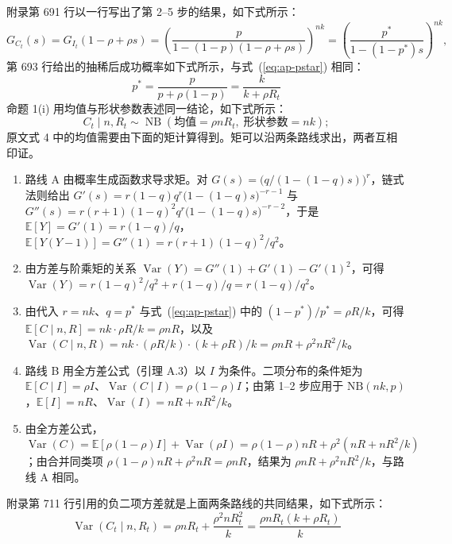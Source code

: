 附录第 691 行以一行写出了第 2--5 步的结果，如下式所示：
\begin{equation*}
G_{C_t}(s) = G_{I_t}(1 - \rho + \rho s) = \left(\frac{p}{1 - (1-p)(1 - \rho + \rho s)}\right)^{nk} = \left(\frac{p^*}{1 - (1-p^*)s}\right)^{nk},
\tag*{原文第 691 行}
\end{equation*}
第 693 行给出的抽稀后成功概率如下式所示，与式~(\ref{eq:ap-pstar}) 相同：
\begin{equation*}
p^* = \frac{p}{p + \rho(1-p)} = \frac{k}{k + \rho R_t}
\tag*{原文第 693 行}
\end{equation*}
命题 1(i) 用均值与形状参数表述同一结论，如下式所示：
\begin{equation*}
C_t \mid n, R_t \sim \operatorname{NB}\!\left(\text{均值} = \rho n R_t, \; \text{形状参数} = nk\right);
\tag{原文式 4}
\end{equation*}
原文式 4 中的均值需要由下面的矩计算得到。矩可以沿两条路线求出，两者互相印证。

\begin{enumerate}
\item 路线 A 由概率生成函数求导求矩。对 $G(s)=\big(q/(1-(1-q)s)\big)^{r}$，链式法则给出 $G'(s)=r(1-q)q^{r}\big(1-(1-q)s\big)^{-r-1}$ 与 $G''(s)=r(r+1)(1-q)^2q^{r}\big(1-(1-q)s\big)^{-r-2}$，于是 $\mathbb{E}[Y]=G'(1)=r(1-q)/q$，$\mathbb{E}[Y(Y-1)]=G''(1)=r(r+1)(1-q)^2/q^2$。
\item 由方差与阶乘矩的关系 $\operatorname{Var}(Y)=G''(1)+G'(1)-G'(1)^2$，可得 $\operatorname{Var}(Y)=r(1-q)^2/q^2+r(1-q)/q=r(1-q)/q^2$。
\item 由代入 $r=nk$、$q=p^*$ 与式~(\ref{eq:ap-pstar}) 中的 $(1-p^*)/p^*=\rho R/k$，可得 $\mathbb{E}[C\mid n,R]=nk\cdot\rho R/k=\rho nR$，以及 $\operatorname{Var}(C\mid n,R)=nk\cdot(\rho R/k)\cdot(k+\rho R)/k=\rho nR+\rho^2nR^2/k$。
\item 路线 B 用全方差公式（引理 A.3）以 $I$ 为条件。二项分布的条件矩为 $\mathbb{E}[C\mid I]=\rho I$、$\operatorname{Var}(C\mid I)=\rho(1-\rho)I$；由第 1--2 步应用于 $\mathrm{NB}(nk,p)$，$\mathbb{E}[I]=nR$、$\operatorname{Var}(I)=nR+nR^2/k$。
\item 由全方差公式，$\operatorname{Var}(C)=\mathbb{E}[\rho(1-\rho)I]+\operatorname{Var}(\rho I)=\rho(1-\rho)nR+\rho^2(nR+nR^2/k)$；由合并同类项 $\rho(1-\rho)nR+\rho^2nR=\rho nR$，结果为 $\rho nR+\rho^2nR^2/k$，与路线 A 相同。
\end{enumerate}

附录第 711 行引用的负二项方差就是上面两条路线的共同结果，如下式所示：
\begin{equation*}
\operatorname{Var}(C_t \mid n, R_t) = \rho n R_t + \frac{\rho^2 n R_t^2}{k} = \frac{\rho n R_t(k + \rho R_t)}{k}
\tag*{原文第 711 行}
\end{equation*}

